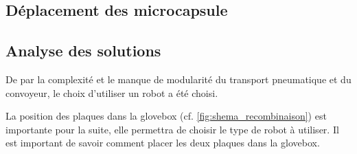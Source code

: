 \subsection{Déplacement des microcapsule}


\subsection{Analyse des solutions}
De par la complexité et le manque de modularité du transport pneumatique et du convoyeur, le choix d'utiliser un robot a été choisi.

La position des plaques dans la \gls{glovebox} (cf. \autoref{fig:shema_recombinaison}) est importante pour la suite, elle permettra de choisir le type de robot à utiliser.
Il est important de savoir comment placer les deux plaques dans la \gls{glovebox}.
